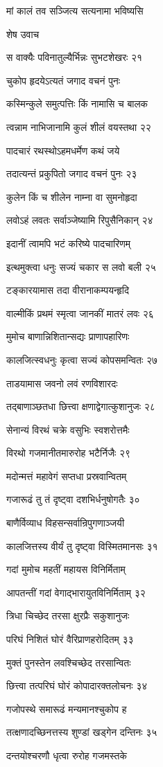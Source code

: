 मां कालं तव सञ्जित्य सत्यनामा भविष्यसि

शेष उवाच

स वाक्यैः पविनातुल्यैर्भिन्नः सुभटशेखरः २१

चुकोप हृदयेऽत्यतं जगाद वचनं पुनः

कस्मिन्कुले समुत्पत्तिः किं नामासि च बालक

त्वन्नाम नाभिजानामि कुलं शीलं वयस्तथा २२

पादचारं रथस्थोऽहमधर्मेण कथं जये

तदात्यन्तं प्रकुपितो जगाद वचनं पुनः २३

कुलेन किं च शीलेन नाम्ना वा सुमनोहृदा

लवोऽहं लवतः सर्वाञ्जेष्यामि रिपुसैनिकान् २४

इदानीं त्वामपि भटं करिष्ये पादचारिणम्

इत्थमुक्त्वा धनुः सज्यं चकार स लवो बली २५

टङ्कारयामास तदा वीरानाकम्पयन्हृदि

वाल्मीकिं प्रथमं स्मृत्वा जानकीं मातरं लवः २६

मुमोच बाणान्निशितान्सद्यः प्राणापहारिणः

कालजित्स्वधनुः कृत्वा सज्यं कोपसमन्वितः २७

ताडयामास जवनो लवं रणविशारदः

तद्बाणाञ्छतधा छित्त्वा क्षणाद्वेगात्कुशानुजः २८

सेनान्यं विरथं चक्रे वसुभिः स्वशरोत्तमैः

विरथो गजमानीतमारुरोह भटैर्निजैः २९

मदोन्मत्तं महावेगं सप्तधा प्रस्रवान्वितम्

गजारूढं तु तं दृष्ट्वा दशभिर्धनुषोगतैः ३०

बाणैर्विव्याध विहसन्सर्वान्रिपुगणाञ्जयी

कालजित्तस्य वीर्यं तु दृष्ट्वा विस्मितमानसः ३१

गदां मुमोच महतीं महायस विनिर्मिताम्

आपतन्तीं गदां वेगाद्भारायुतविनिर्मिताम् ३२

त्रिधा चिच्छेद तरसा क्षुरप्रैः सकुशानुजः

परिघं निशितं घोरं वैरिप्राणहरोदितम् ३३

मुक्तं पुनस्तेन लवश्चिच्छेद तरसान्वितः

छित्त्वा तत्परिघं घोरं कोपादारक्तलोचनः ३४

गजोपस्थे समारूढं मन्यमानश्चुकोप ह

तत्क्षणादच्छिनत्तस्य शुण्डां खड्गेन दन्तिनः ३५

दन्तयोश्चरणौ धृत्वा रुरोह गजमस्तके

